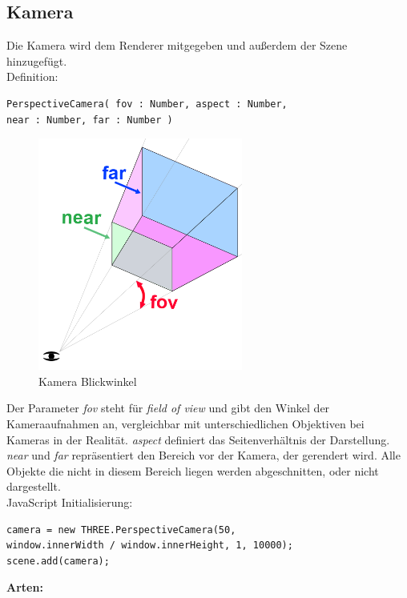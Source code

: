 \subsection{Kamera}
Die Kamera wird dem Renderer mitgegeben und außerdem der Szene hinzugefügt.
\\
Definition:
\begin{lstlisting}
PerspectiveCamera( fov : Number, aspect : Number,
near : Number, far : Number )
\end{lstlisting}
\begin{figure}[h]
    \centering
    \includegraphics[width=0.6\textwidth]{images/threejs-camera.png}
    \caption{Kamera Blickwinkel \cite{fundamentals_camera}}
    \label{fig:my_label}
\end{figure}
Der Parameter \textit{fov} steht für \textit{field of view} und gibt den Winkel der Kameraaufnahmen an, vergleichbar mit unterschiedlichen Objektiven bei Kameras in der Realität.
\textit{aspect} definiert das Seitenverhältnis der Darstellung. 
\textit{near} und \textit{far} repräsentiert den Bereich vor der Kamera, der gerendert wird. Alle Objekte die nicht in diesem Bereich liegen werden abgeschnitten, oder nicht dargestellt. 
\\
JavaScript Initialisierung:
\begin{lstlisting}
camera = new THREE.PerspectiveCamera(50, 
window.innerWidth / window.innerHeight, 1, 10000);
scene.add(camera);
\end{lstlisting}
\newpage 
\textbf{Arten:}  \cite{Camera_Types}
